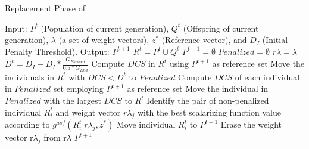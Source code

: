 \begin{algorithm}[t]
        \caption{Replacement Phase of \AVSDMOEAD{}}
\begin{small}
\begin{algorithmic}[1]
\STATE Input: $P^t$ (Population of current generation), $Q^t$ (Offspring of current generation), $\lambda$ (a set of weight vectors), $z^*$ (Reference vector), and $D_I$ (Initial Penalty Threshold).
        \STATE Output: $P^{t+1}$
        \STATE $R^t = P^t \cup Q^t$\label{alg_2:1} 
        \STATE $P^{t+1} = \emptyset$ \label{alg_2:2}
        \STATE $Penalized = \emptyset$ \label{alg_2:3}
				\STATE $r\lambda = \lambda$
        \STATE $D^t = D_I - D_I * \frac{G_{Elapsed}}{0.5*G_{End}}$ \label{alg_2:5} 
         \label{alg_2:6}
            \STATE Compute $DCS$ in $R^t$ using $P^{t+1}$ as reference set \label{alg_2:7}
            \STATE Move the individuals in $R^t$ with $DCS < D^t$ to $Penalized$ \label{alg_2:8}
                 \label{alg_2:9}
                    \STATE Compute $DCS$ of each individual in $Penalized$ set employing $P^{t+1}$ as reference set \label{alg_2:10}
                    \STATE Move the individual in $Penalized$ with the largest $DCS$ to $R^t$ \label{alg_2:11}
                \ENDIF \label{alg_2:12}
            \STATE Identify the pair of non-penalized individual $R_i^t$ and weight vector $r\lambda_j$ with the best scalarizing function value according to $g^{asf}(R_i^t | r\lambda_j, z^*)$ \label{alg_2:13}
	    \STATE Move individual $R_i^t$ to $P^{t+1}$ \label{alg_2:14}
            \STATE Erase the weight vector r$\lambda_j$ from r$\lambda$ \label{alg_2:15}
        \ENDWHILE \label{alg_2:16}
        \RETURN $P^{t+1}$ \label{alg_2:17}
        \end{algorithmic}
\end{small}
\label{alg:replacement}
\end{algorithm}



